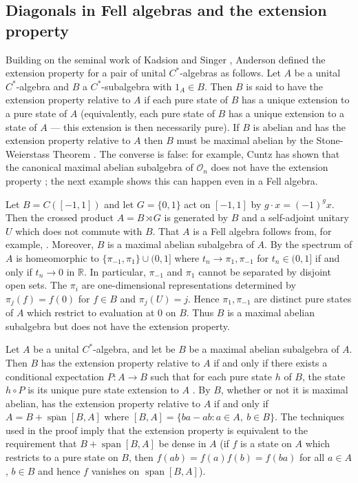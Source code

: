 \documentclass[12pt,a4paper]{amsart}
\newcommand{\field}[1]{\mathbb{#1}}
\newcommand{\RR}{\field{R}}
\newcommand{\lsp}{\operatorname{span}}
\newcommand{\clsp}{\overline{\lsp}}
\begin{document}
\subsection{Diagonals in Fell algebras and the extension
property}

Building on the seminal work of Kadsion and Singer
\cite{Kadison-Singer-1959}, Anderson defined the extension
property for a pair of unital $C^*$-algebras
\cite[Definition~3.3]{Anderson-1979}  as follows. Let $A$ be a
unital $C^*$-algebra and $B$ a $C^*$-subalgebra with $1_A \in
B$. Then $B$ is said to have the extension property relative to
$A$ if each pure state of $B$ has a unique extension to a pure
state of $A$ (equivalently, each pure state of $B$ has a unique
extension to a state of $A$ --- this extension is then
necessarily pure). If $B$ is abelian and has the extension
property relative to $A$ then $B$ must be maximal abelian by the Stone-Weierstass Theorem \cite[p.~311]{Anderson-1979}. The
converse is false: for example, Cuntz has shown that the
canonical maximal abelian subalgebra of $\mathcal{O}_n$ does not
have the extension property \cite[Proposition 3.1]{Cuntz1980}; the next example shows this can happen even in a Fell
algebra.

\begin{example}\label{ex-counter}
Let $B=C([-1,1])$ and let $G=\{0,1\}$ act on $[-1,1]$ by $g
\cdot x = (-1)^g x$. Then the crossed product $A=B\rtimes G$ is
generated by $B$ and a self-adjoint unitary $U$ which does not
commute with $B$. That $A$ is a Fell algebra follows from, for
example, \cite[Lemma~5.10]{aHintegrable}. Moreover, $B$ is a
maximal abelian subalgebra of $A$. By
\cite[Theorem~5.3]{dana-ccr} the spectrum of $A$ is homeomorphic
to $\{\pi_{-1},\pi_1\}\cup(0,1]$ where $t_n\to\pi_1,\pi_{-1}$
for $t_n\in (0,1]$ if and only if $t_n\to 0$ in $\RR$. In
particular, $\pi_{-1}$ and $\pi_{1}$ cannot be separated by
disjoint open sets. The $\pi_i$ are one-dimensional
representations determined by $\pi_j(f) = f(0)$ for $f \in B$
and $\pi_j(U) = j$. Hence $\pi_1, \pi_{-1}$ are distinct pure
states of $A$ which restrict to evaluation at 0 on $B$. Thus $B$
is a maximal abelian subalgebra but does not have the extension
property.
\end{example}

Let $A$ be a unital $C^*$-algebra, and let be $B$ be a maximal
abelian subalgebra of $A$. Then $B$ has the extension property
relative to $A$ if and only if there exists a conditional
expectation $P:A\to B$ such that for each pure state $h$ of $B$,
the state $h\circ P$ is its unique pure state extension to $A$
\cite[Theorem~3.4]{Anderson-1979}. By \cite[Theorem~2.4]{ABG}
$B$, whether or not it is maximal abelian, has the extension
property relative to $A$ if and only if $A = B + \clsp[B, A]$
where $[B, A] = \{ ba - ab : a \in A,\ b \in B \}$. The
techniques used in the proof imply that the extension property
is equivalent to the requirement that $B + \lsp[B, A]$ be dense
in $A$ (if $f$ is a state on $A$ which restricts to a pure state
on $B$, then $f(ab) = f(a)f(b) = f(ba)$ for all $a \in A$, $b
\in B$ and hence $f$ vanishes on $\lsp[B, A]$).
\end{document}
